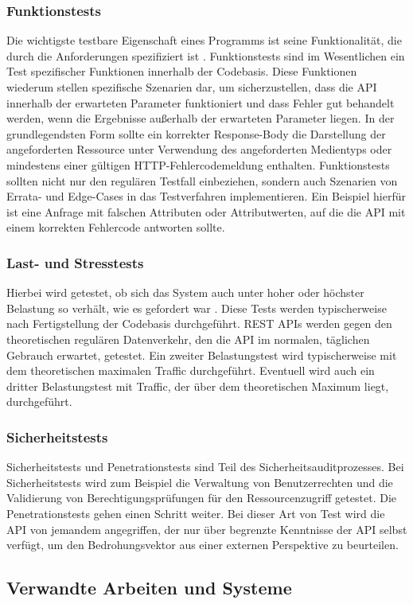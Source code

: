 \subsubsection{Funktionstests}
Die wichtigste testbare Eigenschaft eines Programms ist seine Funktionalität, die durch die Anforderungen spezifiziert ist \parencite[457]{ludewig2007software}. Funktionstests sind im Wesentlichen ein Test spezifischer Funktionen innerhalb der Codebasis. Diese Funktionen wiederum stellen spezifische Szenarien dar, um sicherzustellen, dass die API innerhalb der erwarteten Parameter funktioniert und dass Fehler gut behandelt werden, wenn die Ergebnisse außerhalb der erwarteten Parameter liegen. In der grundlegendsten Form sollte ein korrekter Response-Body die Darstellung der angeforderten Ressource unter Verwendung des angeforderten Medientyps oder mindestens einer gültigen HTTP-Fehlercodemeldung enthalten. Funktionstests sollten nicht nur den regulären Testfall einbeziehen, sondern auch Szenarien von Errata- und Edge-Cases in das Testverfahren implementieren. Ein Beispiel hierfür ist eine Anfrage mit falschen Attributen oder Attributwerten, auf die die API mit einem korrekten Fehlercode antworten sollte.

\subsubsection{Last- und Stresstests}
Hierbei wird getestet, ob sich das System auch unter hoher oder höchster Belastung so verhält, wie es gefordert war \parencite[458]{ludewig2007software}. Diese Tests werden typischerweise nach Fertigstellung der Codebasis durchgeführt. REST APIs werden gegen den theoretischen regulären Datenverkehr, den die API im normalen, täglichen Gebrauch erwartet, getestet. Ein zweiter Belastungstest wird typischerweise mit dem theoretischen maximalen Traffic durchgeführt. Eventuell wird auch ein dritter Belastungstest mit Traffic, der über dem theoretischen Maximum liegt, durchgeführt.

\subsubsection{Sicherheitstests}
Sicherheitstests und Penetrationstests sind Teil des Sicherheitsauditprozesses. Bei Sicherheitstests wird zum Beispiel die Verwaltung von Benutzerrechten und die Validierung von Berechtigungsprüfungen für den Ressourcenzugriff getestet. Die Penetrationstests gehen einen Schritt weiter. Bei dieser Art von Test wird die API von jemandem angegriffen, der nur über begrenzte Kenntnisse der API selbst verfügt, um den Bedrohungsvektor aus einer externen Perspektive zu beurteilen.

\subsection{Verwandte Arbeiten und Systeme}

